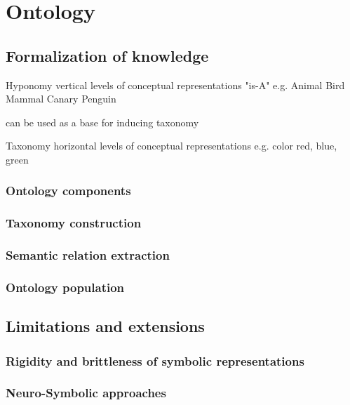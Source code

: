 \chapter{Ontology}
\label{ch:onto}

\section{Formalization of knowledge}
\label{sec:onto:formalization}

Hyponomy 
vertical levels of conceptual representations
"is-A"
e.g.
            Animal
    Bird            Mammal
Canary  Penguin

can be used as a base for inducing taxonomy

Taxonomy
horizontal levels of conceptual representations
e.g.
    color
red, blue, green

\subsection{Ontology components}
\label{sec:onto:components}

\subsection{Taxonomy construction}
\label{sec:onto:taxonomy}

\subsection{Semantic relation extraction}
\label{sec:onto:relation}

\subsection{Ontology population}
\label{sec:onto:population}

\section{Limitations and extensions}
\label{sec:onto:limits}

\subsection{Rigidity and brittleness of symbolic representations}
\label{sec:onto:rigid}

\subsection{Neuro-Symbolic approaches}
\label{sec:onto:nesy}






